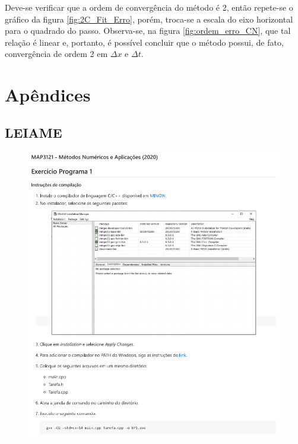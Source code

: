 \documentclass[12pt]{article}
\begin{document}
\begin{spacing}{1.5}
Deve-se verificar que a ordem de convergência do método é 2, então repete-se o gráfico da figura \ref{fig:2C_Fit_Erro}, porém, troca-se a escala do eixo horizontal para o quadrado do passo. Observa-se, na figura \ref{fig:ordem_erro_CN}, que tal relação é linear e, portanto, é possível concluir que o método possui, de fato, convergência de ordem 2 em $\Delta x$ e $\Delta t$.

\clearpage
{}
\nocite{begot}
\printbibliography


\newpage
\appendix
\section*{Apêndices}
\renewcommand{\thesubsection}{\Alph{subsection}}

\subsection{LEIAME} \label{readme}
\vspace{1cm}

\begin{figure}[ht!]
    \centering
    \includegraphics[width=1\linewidth]{README_pg1.png}
    \label{fig:readme_pg1}
\end{figure}


\end{spacing}
\end{document}
